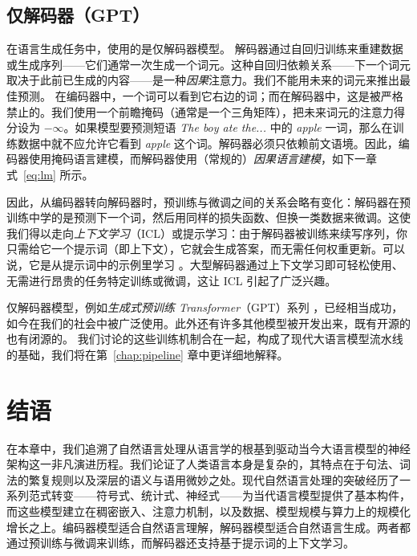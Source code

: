\subsection{仅解码器（GPT）}
在语言生成任务中，使用的是仅解码器模型。
解码器通过自回归训练来重建数据或生成序列——它们通常一次生成一个词元。这种自回归依赖关系——下一个词元取决于此前已生成的内容——是一种\textit{因果}注意力。我们不能用未来的词元来推出最佳预测。
在编码器中，一个词可以看到它右边的词；而在解码器中，这是被严格禁止的。我们使用一个前瞻掩码（通常是一个三角矩阵），把未来词元的注意力得分设为 $-\infty$。如果模型要预测短语 \textit{The boy ate the...} 中的 \textit{apple} 一词，那么在训练数据中就不应允许它看到 \textit{apple} 这个词。解码器必须只依赖前文语境。因此，编码器使用掩码语言建模，而解码器使用（常规的）\textit{因果语言建模}，如下一章式~\ref{eq:lm} 所示。



因此，从编码器转向解码器时，预训练与微调之间的关系会略有变化：解码器在预训练中学的是预测下一个词，然后用同样的损失函数、但换一类数据来微调。这使我们得以走向{\em 上下文学习}（ICL）或提示学习：由于解码器被训练来续写序列，你只需给它一个提示词（即上下文），它就会生成答案，而无需任何权重更新。可以说，它是从提示词中的示例里学习 \citep{brown2020language}。大型解码器通过上下文学习即可轻松使用、无需进行昂贵的任务特定训练或微调，这让 ICL 引起了广泛兴趣。

仅解码器模型，例如{\em 生成式预训练 Transformer}（GPT）系列 \citep{radford2018improving,radford2019language,brown2020language,ouyang2022training,achiam2023gpt}，已经相当成功，如今在我们的社会中被广泛使用。此外还有许多其他模型被开发出来，既有开源的也有闭源的。
%
我们讨论的这些训练机制合在一起，构成了现代大语言模型流水线的基础，我们将在第~\ref{chap:pipeline} 章中更详细地解释。



\section{结语}
在本章中，我们追溯了自然语言处理从语言学的根基到驱动当今大语言模型的神经架构这一非凡演进历程。我们论证了人类语言本身是复杂的，其特点在于句法、词法的繁复规则以及深层的语义与语用微妙之处。现代自然语言处理的突破经历了一系列范式转变——符号式、统计式、神经式——为当代语言模型提供了基本构件，而这些模型建立在稠密嵌入、注意力机制，以及数据、模型规模与算力上的规模化增长之上。编码器模型适合自然语言理解，解码器模型适合自然语言生成。两者都通过预训练与微调来训练，而解码器还支持基于提示词的上下文学习。  %

